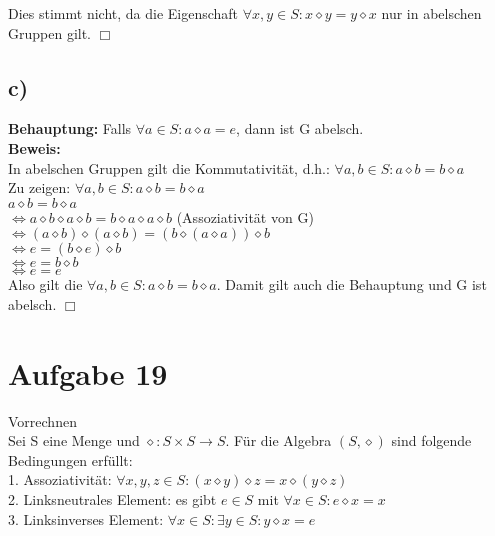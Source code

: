 \documentclass[paper = a4, ngerman]{scrartcl}
\begin{document}
	Dies stimmt nicht, da die Eigenschaft $\forall x, y \in S: x \diamond y = y \diamond x$ nur in abelschen Gruppen gilt.
	\hfill$\Box$\\
		
	\subsection*{c)}
	\textbf{Behauptung:} Falls $\forall a \in S: a \diamond a = e $, dann ist G abelsch.\\
	
	\textbf{Beweis:}\\
	In abelschen Gruppen gilt die Kommutativität, d.h.: $\forall a, b \in S: a \diamond b = b \diamond a$\\
	
	Zu zeigen: $\forall a, b \in S: a \diamond b = b \diamond a$\\
	
	$a \diamond b = b \diamond a$\\
	$\Leftrightarrow a \diamond b \diamond a \diamond b = b \diamond a\diamond a \diamond b$ \hspace{10mm}(Assoziativität von G)\\
	$\Leftrightarrow (a \diamond b) \diamond (a \diamond b) = (b \diamond (a\diamond a)) \diamond b$  \\
	$\Leftrightarrow e = (b \diamond e) \diamond b$  \\
	$\Leftrightarrow e = b \diamond b$  \\
	$\Leftrightarrow e = e$\\
	
	Also gilt die $\forall a, b \in S: a \diamond b = b \diamond a$. Damit gilt auch die Behauptung und G ist abelsch.
		\hfill$\Box$\\
	
\section*{Aufgabe 19}
Vorrechnen\\
Sei S eine Menge und $\diamond: S \times S \to S$. Für die Algebra $(S, \diamond)$ sind folgende Bedingungen erfüllt:\\

1. Assoziativität: $\forall x, y,z \in S: (x \diamond y) \diamond z = x \diamond (y \diamond z)$\\
2. Linksneutrales Element: es gibt $e \in S$ mit $\forall x \in S: e \diamond x = x$\\
3. Linksinverses Element: $\forall x \in S: \exists y \in S: y\diamond x = e$\\
\end{document}
